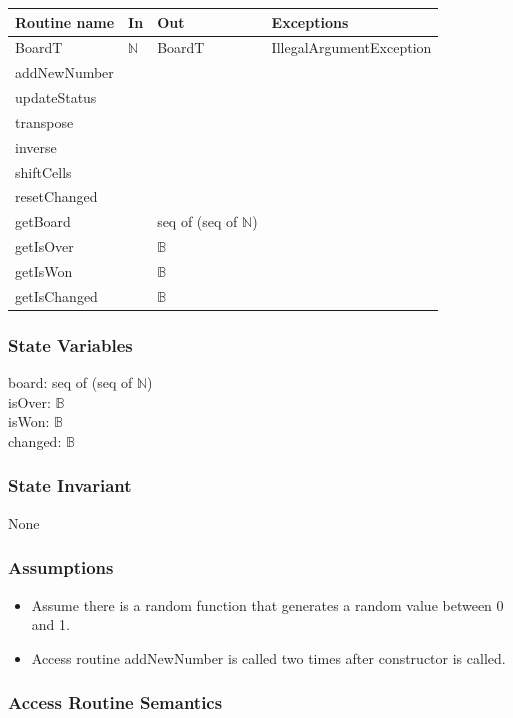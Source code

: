 \documentclass[12pt]{article}
\begin{document}
\begin{tabular}{| l | l | l | l |}
\hline
\textbf{Routine name} & \textbf{In} & \textbf{Out} & \textbf{Exceptions}\\
\hline
BoardT & $\mathbb{N}$ & BoardT & IllegalArgumentException\\
\hline
addNewNumber &  &  & \\
\hline
updateStatus &  &  & \\
\hline
transpose &  &  & \\
\hline
inverse &  &  & \\
\hline
shiftCells &  &  & \\
\hline
resetChanged  &  &  & \\
\hline
getBoard  &  & seq of (seq of $\mathbb{N}$) & \\
\hline
getIsOver  &  & $\mathbb{B}$ & \\
\hline
getIsWon  &  & $\mathbb{B}$ & \\
\hline
getIsChanged   &  & $\mathbb{B}$ & \\
\hline
\end{tabular}

\subsubsection* {State Variables}

board: seq of (seq of $\mathbb{N}$) \\
isOver: $\mathbb{B}$ \\
isWon: $\mathbb{B}$ \\
changed: $\mathbb{B}$

\subsubsection* {State Invariant}
None

\subsubsection* {Assumptions}
\begin{itemize}
  \item Assume there is a random function that generates a random value between 0 and 1.
  \item Access routine addNewNumber is called two times after constructor is called.
\end{itemize}

\subsubsection* {Access Routine Semantics}
\end{document}
